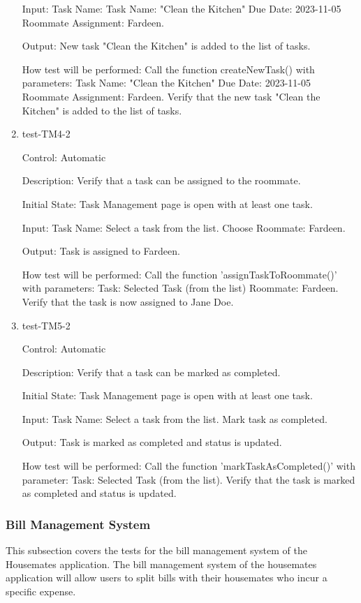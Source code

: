 \documentclass[12pt, titlepage]{article}
\begin{document}
\begin{enumerate}
Input: Task Name: Task Name: "Clean the Kitchen"
Due Date: 2023-11-05
Roommate Assignment: Fardeen.
					
Output: New task "Clean the Kitchen" is added to the list of tasks.

How test will be performed: 
Call the function createNewTask() with parameters:
Task Name: "Clean the Kitchen"
Due Date: 2023-11-05
Roommate Assignment: Fardeen.
Verify that the new task "Clean the Kitchen" is added to the list of tasks.

\item{test-TM4-2\\}

Control: Automatic

Description: Verify that a task can be assigned to the roommate.
					
Initial State: Task Management page is open with at least one task.
					
Input: Task Name: Select a task from the list. Choose Roommate: Fardeen.
					
Output: Task is assigned to Fardeen.


How test will be performed:
Call the function 'assignTaskToRoommate()' with parameters:
Task: Selected Task (from the list)
Roommate: Fardeen.
Verify that the task is now assigned to Jane Doe.

\item{test-TM5-2\\}

Control: Automatic

Description: Verify that a task can be marked as completed.
					
Initial State: Task Management page is open with at least one task.
					
Input: Task Name: Select a task from the list.
Mark task as completed.
					
Output: Task is marked as completed and status is updated.

How test will be performed:
Call the function 'markTaskAsCompleted()' with parameter:
Task: Selected Task (from the list).
Verify that the task is marked as completed and status is updated.

\end{enumerate}

\subsubsection{Bill Management System}

This subsection covers the tests for the bill management system of the Housemates application. The bill management system of the housemates application will allow users to split bills with their housemates who incur a specific expense.
\end{document}
